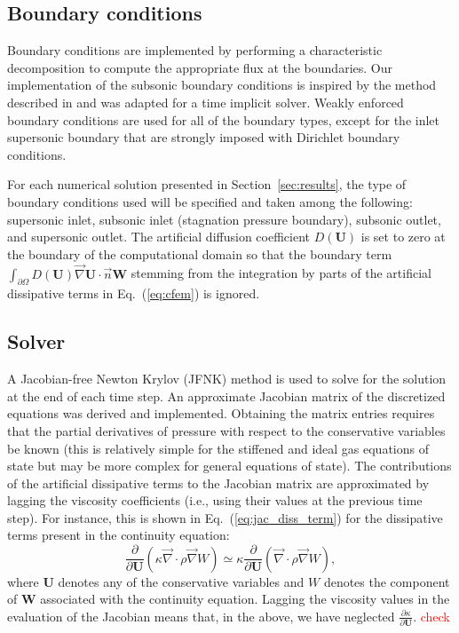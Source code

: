 \documentclass[review,10pt]{elsarticle}
\renewcommand{\div}{\vec{\nabla}\! \cdot \!}
\newcommand{\grad}{\vec{\nabla}}
\newcommand{\eqt}[1]{Eq.~(\ref{#1})}                     %
\newcommand{\sct}[1]{Section~\ref{#1}}                   %
\newcommand{\tcr}[1]{\textcolor{red}{#1}}
\begin{document}
\subsection{Boundary conditions} \label{sec:bc}
Boundary conditions are implemented by performing a characteristic decomposition to compute the 
appropriate flux at the boundaries.
Our implementation of the subsonic boundary conditions is inspired by the method described in \cite{SEM} 
and was adapted for a time implicit solver. Weakly enforced boundary conditions are used for all of the 
boundary types, except for the inlet supersonic boundary that are strongly imposed with Dirichlet boundary conditions.

For each numerical solution presented in \sct{sec:results}, the type of boundary conditions used 
will be specified and taken among the following: supersonic inlet, subsonic inlet (stagnation pressure boundary), 
subsonic outlet, and supersonic outlet. 
The artificial diffusion coefficient $D(\mathbf  U)$ is set to zero at the boundary of the computational 
domain so that the boundary term 
$\int_{\partial \Omega} D(\mathbf  U) \grad \mathbf  U \cdot \vec{n} \mathbf W$ stemming from the 
integration by parts of the artificial dissipative terms in \eqt{eq:cfem} is ignored.
%
\subsection{Solver} \label{sec:solver}
A Jacobian-free Newton Krylov (JFNK) method is used to solve for the solution at the end of each time step. 
An approximate Jacobian matrix of the discretized equations was derived and implemented. Obtaining the 
matrix entries requires that the partial derivatives of pressure with respect to the conservative variables 
be known (this is relatively simple for the stiffened and ideal gas equations of state but may be more 
complex for general equations of state). The contributions of the artificial dissipative terms to the 
Jacobian matrix are approximated by lagging the viscosity coefficients (i.e., using their values at the previous time step). 
For instance, this is shown in \eqt{eq:jac_diss_term} for the dissipative terms present in the continuity equation:
\begin{equation}
\label{eq:jac_diss_term}
\frac{\partial}{\partial \mathbf U} \left( \kappa \div \rho \grad W \right) \simeq \kappa \frac{\partial}{\partial \mathbf U} \left( \div \rho \grad W \right),
\end{equation}  
where $\mathbf  U$ denotes any of the conservative variables and $W$ denotes the component of $\mathbf  W$ associated with the 
continuity equation. Lagging the viscosity values in the evaluation of the Jacobian means that, in the above, 
we have neglected $\frac{\partial \kappa}{\partial \mathbf U}$.
\tcr{check}
%
\end{document}
